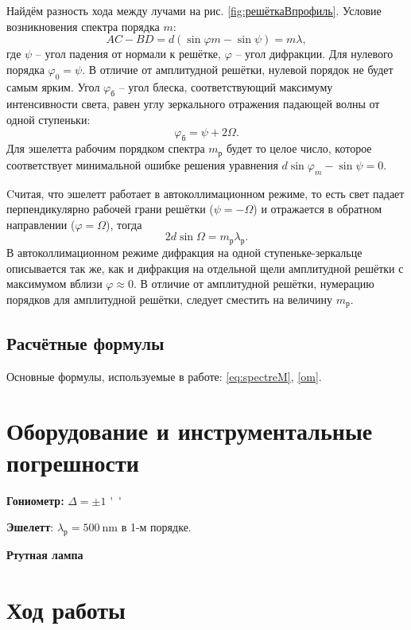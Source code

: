 \documentclass[a4paper]{article}
\newcommand{\Equip}[3]{

	{\bf #1:} $\Delta = \pm #2$ \si{#3}}
\newcommand{\equip}[1]{

	{\bf #1}}
\begin{document}
Найдём разность хода между лучами на рис. \ref{fig:решёткаВпрофиль}. Условие возникновения спектра порядка $ m $:
\begin{equation}\label{eq:spectreM}
	A C - B D = d (\sin \varphi m- \sin \psi) = m \lambda,
\end{equation}
где $ \psi $ -- угол падения от нормали к решётке, $ \varphi $ -- угол дифракции.
Для нулевого порядка $ \varphi_0 = \psi $. В отличие от амплитудной решётки, нулевой порядок не будет самым ярким. Угол $ \varphi_б $ -- угол блеска, соответствующий максимуму интенсивности света, равен углу зеркального отражения падающей волны от одной ступеньки:
\begin{equation*}\label{key}
	\varphi_б = \psi+ 2 \Omega.
\end{equation*}
Для эшелетта рабочим порядком спектра $  m_р$ будет то целое число, которое соответствует минимальной ошибке решения уравнения $d \sin \varphi_m - \sin \psi = 0 $.

Cчитая, что эшелетт работает в автоколлимационном режиме, то есть свет падает перпендикулярно рабочей грани решётки ($ \psi = -\Omega $) и отражается в обратном направлении ($ \varphi = \Omega $), тогда
\begin{equation}\label{om}
	2 d \sin \Omega = m_р \lambda_р.
\end{equation}
В автоколлимационном режиме дифракция на одной ступеньке-зеркальце описывается так же, как и дифракция на отдельной щели амплитудной решётки с максимумом вблизи $ \varphi \approx 0 $. В отличие от амплитудной решётки, нумерацию порядков для амплитудной решётки, следует сместить на величину $ m_р $.

\subsection{Расчётные формулы}

Основные формулы, используемые в работе: \eqref{eq:spectreM}, \eqref{om}. %

\section{Оборудование и инструментальные погрешности}

\Equip{Гониометр}{1}{''}
\equip{Эшелетт}: $ \lambda_р = \SI{500}{\nano \metre} $ в 1-м порядке.
\equip{Ртутная лампа}

\section{Ход работы}
\end{document}
